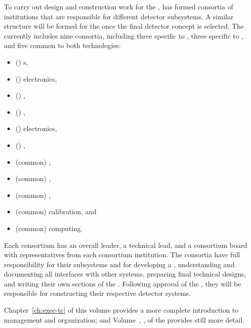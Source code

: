 To carry out design and construction work for the  ,  has  formed consortia of institutions that are responsible for different detector subsystems. A similar structure will be formed for the   once the final detector concept is selected. The   currently includes nine consortia, including three specific to , three specific to , and five common to both technologies:
\begin{itemize}
\item (\single) s, %
\item (\single)  electronics, %
\item (\single) , %
\item (\dual) , %
\item (\dual)  electronics, %
\item (\dual) , %
\item (common) , %
\item (common) ,  %
\item (common) , %
\item (common) calibration,  and %
\item (common) computing.
\end{itemize} 
 Each consortium has an overall leader, a technical lead, and a consortium board with representatives from each consortium institution. The consortia have full responsibility for their subsystems and for developing a , understanding and documenting all interfaces with other systems, preparing final technical designs, and writing their own sections of the . Following approval of the  , they will be responsible for constructing their respective detector systems. %

Chapter~\ref{ch:exec-tc} of this volume provides a more complete introduction to  management and organization; and Volume~\volnumbertc{}, \voltitletc{}, of the  provides still more detail.


